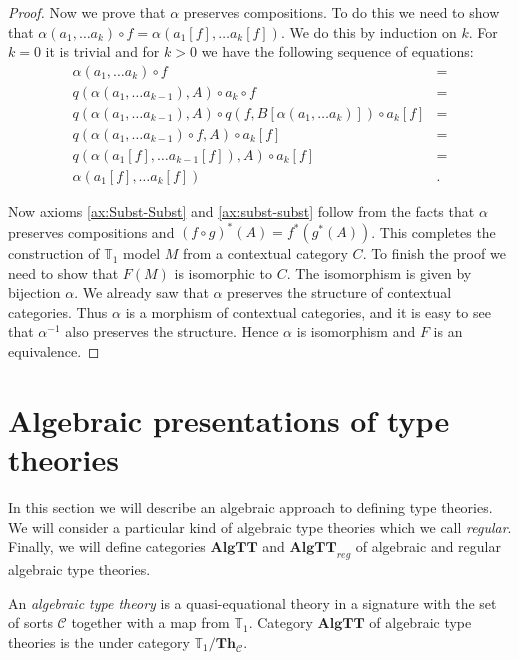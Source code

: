\documentclass{amsart}
\theoremstyle{definition}
\theoremstyle{remark}
\newcommand{\cat}[1]{\mathbf{#1}}
\newcommand{\algtt}{\cat{AlgTT}}
\numberwithin{figure}{section}
\begin{document}
\begin{proof}
Now we prove that $\alpha$ preserves compositions.
To do this we need to show that $\alpha(a_1, \ldots a_k) \circ f = \alpha(a_1[f], \ldots a_k[f])$.
We do this by induction on $k$.
For $k = 0$ it is trivial and for $k > 0$ we have the following sequence of equations:
\begin{align*}
\alpha(a_1, \ldots a_k) \circ f & = \\
q(\alpha(a_1, \ldots a_{k-1}), A) \circ a_k \circ f & = \\
q(\alpha(a_1, \ldots a_{k-1}), A) \circ q(f, B[\alpha(a_1, \ldots a_k)]) \circ a_k[f] & = \\
q(\alpha(a_1, \ldots a_{k-1}) \circ f, A) \circ a_k[f] & = \\
q(\alpha(a_1[f], \ldots a_{k-1}[f]), A) \circ a_k[f] & = \\
\alpha(a_1[f], \ldots a_k[f]) & .
\end{align*}

Now axioms \eqref{ax:Subst-Subst} and \eqref{ax:subst-subst} follow from the facts that $\alpha$ preserves compositions and $(f \circ g)^*(A) = f^*(g^*(A))$.
This completes the construction of $\mathbb{T}_1$ model $M$ from a contextual category $C$.
To finish the proof we need to show that $F(M)$ is isomorphic to $C$.
The isomorphism is given by bijection $\alpha$.
We already saw that $\alpha$ preserves the structure of contextual categories.
Thus $\alpha$ is a morphism of contextual categories, and it is easy to see that $\alpha^{-1}$ also preserves the structure.
Hence $\alpha$ is isomorphism and $F$ is an equivalence.
\end{proof}

\section{Algebraic presentations of type theories}

In this section we will describe an algebraic approach to defining type theories.
We will consider a particular kind of algebraic type theories which we call \emph{regular}.
Finally, we will define categories $\algtt$ and $\algtt_{reg}$ of algebraic and regular algebraic type theories.

\begin{defn}
An \emph{algebraic type theory} is a quasi-equational theory in a signature with the set of sorts $\mathcal{C}$ together with a map from $\mathbb{T}_1$.
Category $\algtt$ of algebraic type theories is the under category $\mathbb{T}_1 / \cat{Th}_\mathcal{C}$.
\end{defn}
\end{document}
